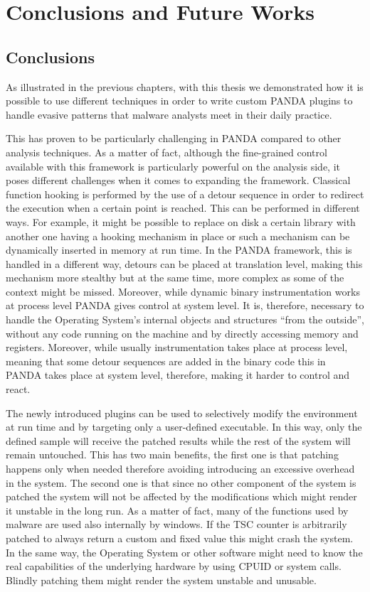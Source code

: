 \chapter{Conclusions and Future Works}
\label{chap:6}

\section{Conclusions}

As illustrated in the previous chapters, with this thesis we demonstrated how it is possible to use different techniques in order to write custom PANDA plugins to handle evasive patterns that malware analysts meet in their daily practice.

This has proven to be particularly challenging in PANDA compared to other analysis techniques. As a matter of fact, although the fine-grained control available with this framework is particularly powerful on the analysis side, it poses different challenges when it comes to expanding the framework. Classical function hooking is performed by the use of a detour sequence in order to redirect the execution when a certain point is reached. This can be performed in different ways. For example, it might be possible to replace on disk a certain library with another one having a hooking mechanism in place or such a mechanism can be dynamically inserted in memory at run time. In the PANDA framework, this is handled in a different way, detours can be placed at translation level, making this mechanism more stealthy but at the same time, more complex as some of the context might be missed. Moreover, while dynamic binary instrumentation works at process level PANDA gives control at system level. It is, therefore, necessary to handle the Operating System's internal objects and structures ``from the outside'', without any code running on the machine and by directly accessing memory and registers. Moreover, while usually instrumentation takes place at process level, meaning that some detour sequences are added in the binary code this in PANDA takes place at system level, therefore, making it harder to control and react.

The newly introduced plugins can be used to selectively modify the environment at run time and by targeting only a user-defined executable. In this way, only the defined sample will receive the patched results while the rest of the system will remain untouched. This has two main benefits, the first one is that patching happens only when needed therefore avoiding introducing an excessive overhead in the system. The second one is that since no other component of the system is patched the system will not be affected by the modifications which might render it unstable in the long run. As a matter of fact, many of the functions used by malware are used also internally by windows. If the TSC counter is arbitrarily patched to always return a custom and fixed value this might crash the system. In the same way, the Operating System or other software might need to know the real capabilities of the underlying hardware by using CPUID or system calls. Blindly patching them might render the system unstable and unusable. 


